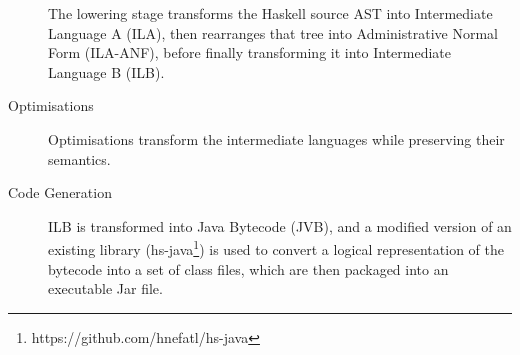 \documentclass[dissertation.tex]{subfiles}
\begin{document}
\begin{description}
{    The lowering stage transforms the Haskell source AST into Intermediate Language A (ILA), then rearranges that
    tree into Administrative Normal Form (ILA-ANF), before finally transforming it into Intermediate Language B
    (ILB).

}
\item[Optimisations]
{
    \hfill

    Optimisations transform the intermediate languages while preserving their semantics.


}
\item[Code Generation]
{
    \hfill

    ILB is transformed into Java Bytecode (JVB), and a modified version of an existing library
    (hs-java\footnote{https://github.com/hnefatl/hs-java}) is used to convert a logical representation of the
    bytecode into a set of class files, which are then packaged into an executable Jar file.

}
\end{description}
\end{document}
